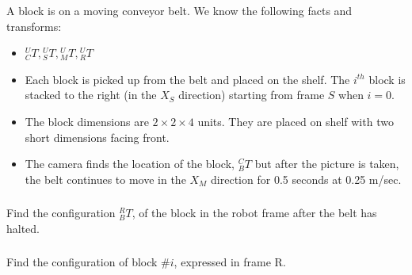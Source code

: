 \documentclass{article}
\begin{document}
\vspace{0.25in}
A block is on a moving conveyor belt.  We know the following facts and transforms:
\begin{itemize}
  \item ${^U_CT},{^U_ST},{^U_MT},{^U_RT}$
  \item Each block is picked up from the belt and placed on the shelf.  The $i^{th}$ block is stacked to the right (in the $X_S$ direction) starting from frame $S$ when $i=0$.
  \item The block dimensions are $2\times2\times4$ units. They are placed on shelf with two short dimensions facing front.
  \item The camera finds the location of the block, ${^C_BT}$ but after the picture is taken, the belt continues to move in the $X_M$ direction for 0.5 seconds at 0.25 m/sec.
\end{itemize}

\vspace{0.15in}
\subsubsection{}
Find the configuration ${^R_BT}$, of the block in the robot frame after the belt has halted.

\subsubsection{}

Find the configuration of block \#$i$, expressed in frame R.
\end{document}
